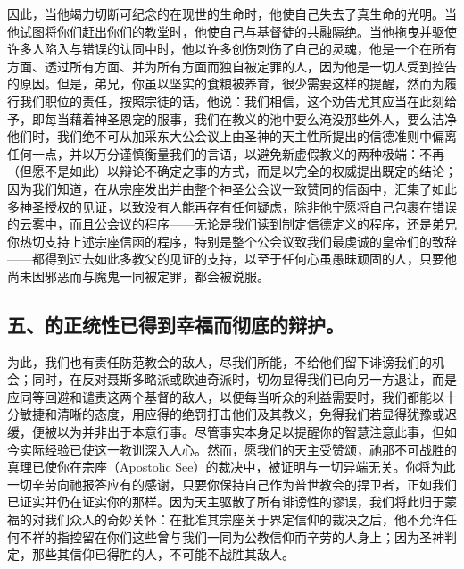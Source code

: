因此，当他竭力切断可纪念的在现世的生命时，他使自己失去了真生命的光明。当他试图将你们赶出你们的教堂时，他使自己与基督徒的共融隔绝。当他拖曳并驱使许多人陷入与错误的认同中时，他以许多创伤刺伤了自己的灵魂，他是一个在所有方面、透过所有方面、并为所有方面而独自被定罪的人，因为他是一切人受到控告的原因。但是，弟兄，你虽以坚实的食粮被养育，很少需要这样的提醒，然而为履行我们职位的责任，按照宗徒的话，他说：我们相信，这个劝告尤其应当在此刻给予，即每当藉着神圣恩宠的服事，我们在教义的池中要么淹没那些外人，要么洁净他们时，我们绝不可从加采东大公会议上由圣神的天主性所提出的信德准则中偏离任何一点，并以万分谨慎衡量我们的言语，以避免新虚假教义的两种极端：不再（但愿不是如此）以辩论不确定之事的方式，而是以完全的权威提出既定的结论；因为我们知道，在从宗座发出并由整个神圣公会议一致赞同的信函中，汇集了如此多神圣授权的见证，以致没有人能再存有任何疑虑，除非他宁愿将自己包裹在错误的云雾中，而且公会议的程序——无论是我们读到制定信德定义的程序，还是弟兄你热切支持上述宗座信函的程序，特别是整个公会议致我们最虔诚的皇帝们的致辞——都得到过去如此多教父的见证的支持，以至于任何心虽愚昧顽固的人，只要他尚未因邪恶而与魔鬼一同被定罪，都会被说服。\par


\subsection{五、的正统性已得到幸福而彻底的辩护。}

为此，我们也有责任防范教会的敌人，尽我们所能，不给他们留下诽谤我们的机会；同时，在反对聂斯多略派或欧迪奇派时，切勿显得我们已向另一方退让，而是应同等回避和谴责这两个基督的敌人，以便每当听众的利益需要时，我们都能以十分敏捷和清晰的态度，用应得的绝罚打击他们及其教义，免得我们若显得犹豫或迟缓，便被以为并非出于本意行事。尽管事实本身足以提醒你的智慧注意此事，但如今实际经验已使这一教训深入人心。然而，愿我们的天主受赞颂，祂那不可战胜的真理已使你在宗座（Apostolic See）的裁决中，被证明与一切异端无关。你将为此一切辛劳向祂报答应有的感谢，只要你保持自己作为普世教会的捍卫者，正如我们已证实并仍在证实你的那样。因为天主驱散了所有诽谤性的谬误，我们将此归于蒙福的对我们众人的奇妙关怀：在批准其宗座关于界定信仰的裁决之后，他不允许任何不祥的指控留在你们这些曾与我们一同为公教信仰而辛劳的人身上；因为圣神判定，那些其信仰已得胜的人，不可能不战胜其敌人。\par

